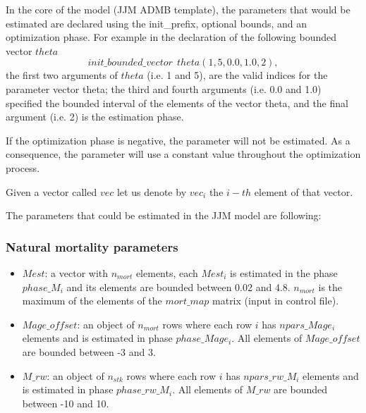 \documentclass{article}
\begin{document}
In the core of the model (JJM ADMB template), the parameters that would be estimated are declared using the init\_prefix, optional bounds, and an optimization phase. For example in the declaration of the following bounded vector $theta$
\begin{equation*}
    init\_bounded\_vector \ \ theta(1,5,0.0,1.0,2),
\end{equation*}
the first two arguments of $theta$ (i.e. 1 and 5), are the valid indices for the parameter vector theta; the third and fourth arguments (i.e. 0.0 and 1.0) specified the bounded interval of the elements of the vector theta, and the final argument (i.e. 2) is the estimation phase.


If the optimization phase is negative, the parameter will not be estimated. As a consequence, the parameter will use a constant value throughout the optimization process.

Given a vector called $vec$ let us denote by $vec_i$ the $i-th$ element of that vector.


The parameters that could be estimated in the JJM model are following:

\subsubsection{Natural mortality parameters}
\begin{itemize}
    
    \item $Mest$: a vector with $n_{mort}$ elements, each $Mest_i$ is estimated in the phase $phase\_M_i$ and its elements are bounded between 0.02 and 4.8. $n_{mort}$ is the maximum of the elements of the $mort\_map$ matrix (input in control file).
    
    \item $Mage\_offset$: an object of $n_{mort}$ rows where each row $i$ has $npars\_Mage_i$ elements and is estimated in phase $phase\_Mage_i$. %
     All elements of $Mage\_offset$ are bounded between -3 and 3.
    
    \item $M\_rw$: an object of $n_{stk}$ rows where each row $i$ has $npars\_rw\_M_i$ elements and is estimated in phase $phase\_rw\_M_i$. All elements of $M\_rw$ are bounded between -10 and 10.
    
\end{itemize}
\end{document}
